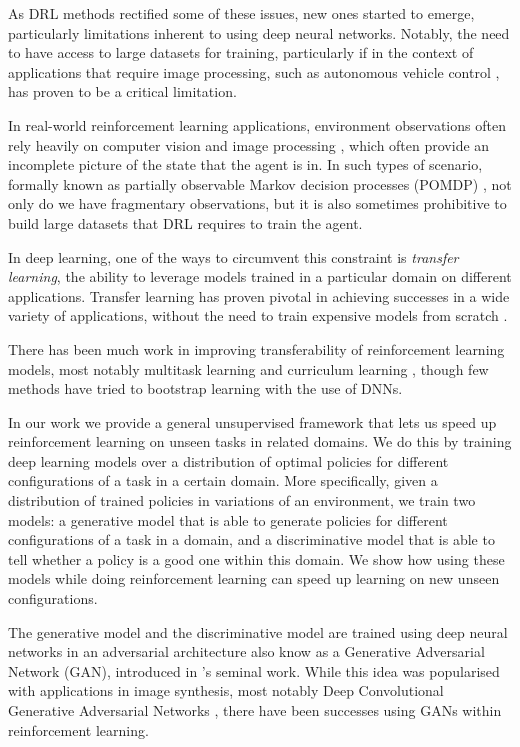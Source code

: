 As DRL methods rectified some of these issues, new ones started to emerge, particularly limitations inherent to using deep neural networks. Notably, the need to have access to large datasets for training, particularly if in the context of applications that require image processing, such as autonomous vehicle control \parencite{krizhevsky2012imagenet}, has proven to be a critical limitation. 

In real-world reinforcement learning applications, environment observations often rely heavily on computer vision and image processing \parencite{berns1992reinforcement}, which often provide an incomplete picture of the state that the agent is in. In such types of scenario, formally known as partially observable Markov decision processes (POMDP) \parencite{monahan1982state}, not only do we have fragmentary observations, but it is also sometimes prohibitive to build large datasets that DRL requires to train the agent.

In deep learning, one of the ways to circumvent this constraint is \emph{transfer learning}, the ability to leverage models trained in a particular domain on different applications. Transfer learning has proven pivotal in achieving successes in a wide variety of applications, without the need to train expensive models from scratch \parencite{pan2010survey}.

There has been much work in improving transferability of reinforcement learning models, most notably multitask learning \parencite{caruana1998multitask} and curriculum learning \parencite{bengio2009curriculum}, though few methods have tried to bootstrap learning with the use of DNNs.

In our work we provide a general unsupervised framework that lets us speed up reinforcement learning on unseen tasks in related domains. We do this by training deep learning models over a distribution of optimal policies for different configurations of a task in a certain domain. More specifically, given a distribution of trained policies in variations of an environment, we train two models: a generative model that is able to generate policies for different configurations of a task in a domain, and a discriminative model that is able to tell whether a policy is a good one within this domain. We show how using these models while doing reinforcement learning can speed up learning on new unseen configurations.

The generative model and the discriminative model are trained using deep neural networks in an adversarial architecture also know as a Generative Adversarial Network (GAN), introduced in \cite{goodfellow2014generative}'s seminal work. While this idea was popularised with applications in image synthesis, most notably Deep Convolutional Generative Adversarial Networks \parencite{radford2015unsupervised}, there have been successes using GANs within reinforcement learning.

